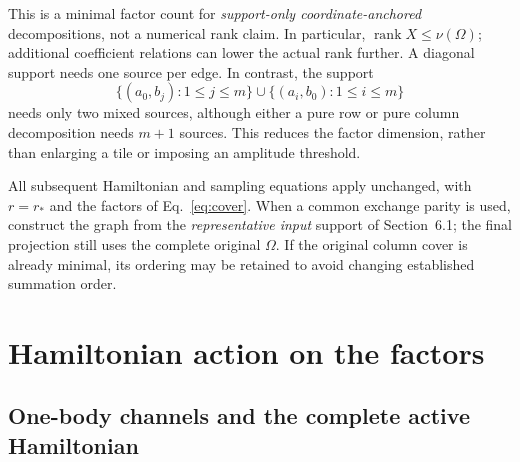 \documentclass[11pt,a4paper]{article}
\DeclareMathOperator{\rank}{rank}
\begin{document}
This is a minimal factor count for \emph{support-only coordinate-anchored}
decompositions, not a numerical rank claim. In particular,
$\rank X\le\nu(\Omega)$; additional coefficient relations can lower the
actual rank further. A diagonal support needs one source per edge. In
contrast, the support
\begin{equation}
 \{(a_0,b_j):1\le j\le m\}
 \cup\{(a_i,b_0):1\le i\le m\}
\end{equation}
needs only two mixed sources, although either a pure row or pure column
decomposition needs $m+1$ sources. This reduces the factor dimension,
rather than enlarging a tile or imposing an amplitude threshold.

All subsequent Hamiltonian and sampling equations apply unchanged, with
$r=r_*$ and the factors of Eq.~\eqref{eq:cover}. When a common exchange
parity is used, construct the graph from the \emph{representative input}
support of Section~6.1; the final projection still uses the complete
original $\Omega$. If the original column cover is already minimal, its
ordering may be retained to avoid changing established summation order.

\section{Hamiltonian action on the factors}

\subsection{One-body channels and the complete active Hamiltonian}
\end{document}
